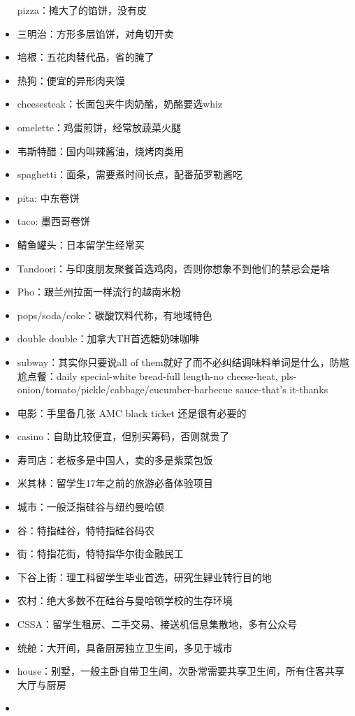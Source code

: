 \documentclass[]{tufte-book}
\begin{document}
\begin{itemize}
  pizza：摊大了的馅饼，没有皮
\item
  三明治：方形多层馅饼，对角切开卖
\item
  培根：五花肉替代品，省的腌了
\item
  热狗：便宜的异形肉夹馍
\item
  cheesesteak：长面包夹牛肉奶酪，奶酪要选whiz
\item
  omelette：鸡蛋煎饼，经常放蔬菜火腿
\item
  韦斯特醋：国内叫辣酱油，烧烤肉类用
\item
  spaghetti：面条，需要煮时间长点，配番茄罗勒酱吃
\item
  pita: 中东卷饼
\item
  taco: 墨西哥卷饼
\item
  鲭鱼罐头：日本留学生经常买
\item
  Tandoori：与印度朋友聚餐首选鸡肉，否则你想象不到他们的禁忌会是啥
\item
  Pho：跟兰州拉面一样流行的越南米粉
\item
  pops/soda/coke：碳酸饮料代称，有地域特色
\item
  double double：加拿大TH首选糖奶味咖啡
\item
  subway：其实你只要说all of them就好了而不必纠结调味料单词是什么，防尴尬点餐：daily special-white bread-full length-no cheese-heat, pls-onion/tomato/pickle/cabbage/cucumber-barbecue sauce-that's it-thanks
\item
  电影：手里备几张 AMC black ticket 还是很有必要的
\item
  casino：自助比较便宜，但别买筹码，否则就贵了
\item
  寿司店：老板多是中国人，卖的多是紫菜包饭
\item
  米其林：留学生17年之前的旅游必备体验项目
\item
  城市：一般泛指硅谷与纽约曼哈顿
\item
  谷：特指硅谷，特特指硅谷码农
\item
  街：特指花街，特特指华尔街金融民工
\item
  下谷上街：理工科留学生毕业首选，研究生肄业转行目的地
\item
  农村：绝大多数不在硅谷与曼哈顿学校的生存环境
\item
  CSSA：留学生租房、二手交易、接送机信息集散地，多有公众号
\item
  统舱：大开间，具备厨房独立卫生间，多见于城市
\item
  house：别墅，一般主卧自带卫生间，次卧常需要共享卫生间，所有住客共享大厅与厨房
\item

\end{itemize}
\end{document}
